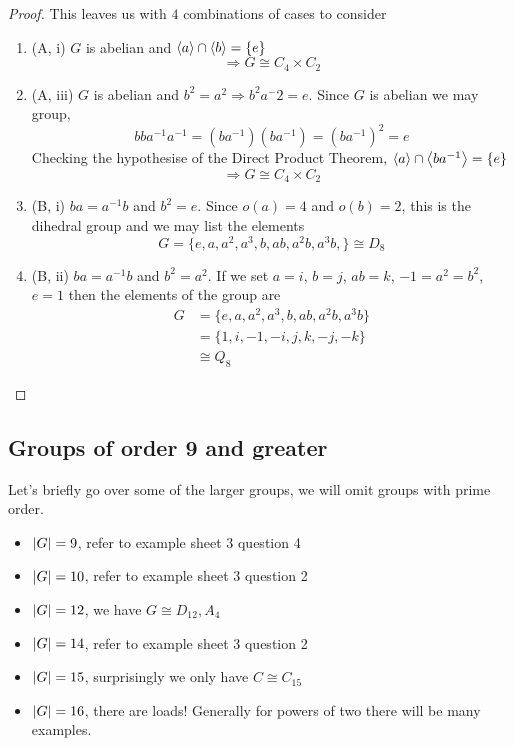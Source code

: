 \documentclass{article}
\begin{document}
\begin{proof}
    This leaves us with $4$ combinations of cases to consider
    \begin{enumerate}[cases]
        \item (A, i) $G$ is abelian and $\left\langle a\right\rangle \cap \left\langle b\right\rangle = \{ e \}$
        \[
            \Rightarrow G \cong C_4 \times C_2 \tag{By DPT}  
        \]
        \item (A, iii) $G$ is abelian and $b^2 = a^2 \Rightarrow b^2a^-2 = e$. Since $G$ is abelian we may group,
        \[
            bba^{-1}a^{-1} = (ba^{-1})(ba^{-1}) = (ba^{-1})^2 = e  
        \]
        Checking the hypothesise of the Direct Product Theorem, $\left\langle a\right\rangle \cap \left\langle ba^{-1}\right\rangle = \{ e \}$
        \[
            \Rightarrow G \cong C_4 \times C_2  
        \]
        \item (B, i) $ba = a^{-1}b$ and $b^2 = e$. Since $o(a) = 4$ and $o(b) = 2$, this is the dihedral group and we may list the elements
        \[
            G = \{e, a, a^2, a^3, b, ab, a^2b, a^3b,\} \cong D_8
        \]
        \item (B, ii) $ba = a^{-1}b$ and $b^2 = a^2$. If we set $a = i$, $b = j$, $ab = k$, $-1 = a^2 = b^2$, $e = 1$ then the elements of the group are
        \begin{align*}
            G &= \{e, a, a^2, a^3, b, ab, a^2b, a^3b\} \\
            &= \{1, i, -1, -i, j, k, -j, -k\} \\
            &\cong Q_8
        \end{align*}
    \end{enumerate}
\end{proof}

\subsection{Groups of order 9 and greater}
Let's briefly go over some of the larger groups, we will omit groups with prime order.
\begin{itemize}
    \item $\left\lvert G\right\rvert = 9$, refer to example sheet 3 question 4
    \item $\left\lvert G\right\rvert = 10$, refer to example sheet 3 question 2
    \item $\left\lvert G\right\rvert = 12$, we have $G \cong D_{12}, A_4$
    \item $\left\lvert G\right\rvert = 14$, refer to example sheet 3 question 2
    \item $\left\lvert G\right\rvert = 15$, surprisingly we only have $C \cong C_{15}$
    \item $\left\lvert G\right\rvert = 16$, there are loads! Generally for powers of two there will be many examples.
\end{itemize}
\end{document}
